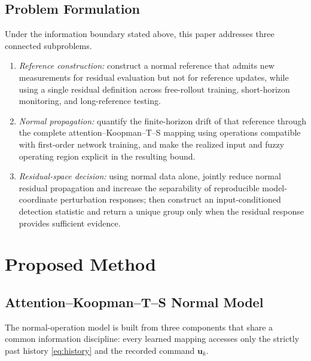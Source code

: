 \documentclass[journal]{IEEEtran}
\newcommand{\1}{\bm 1}
\begin{document}
\subsection{Problem Formulation}
Under the information boundary stated above, this paper addresses three
connected subproblems.
\begin{enumerate}
\item \emph{Reference construction:} construct a normal reference that admits
new measurements for residual evaluation but not for reference updates, while
using a single residual definition across free-rollout training, short-horizon
monitoring, and long-reference testing.

\item \emph{Normal propagation:} quantify the finite-horizon drift of that
reference through the complete attention--Koopman--T--S mapping using
operations compatible with first-order network training, and make the realized
input and fuzzy operating region explicit in the resulting bound.

\item \emph{Residual-space decision:} using normal data alone, jointly reduce
normal residual propagation and increase the separability of reproducible
model-coordinate perturbation responses; then construct an input-conditioned
detection statistic and return a unique group only when the residual response
provides sufficient evidence.
\end{enumerate}

\section{Proposed Method}
\subsection{Attention--Koopman--T--S Normal Model}
The normal-operation model is built from three components that share a common
information discipline: every learned mapping accesses only the strictly past
history \eqref{eq:history} and the recorded command $\bm u_k$.
\end{document}

